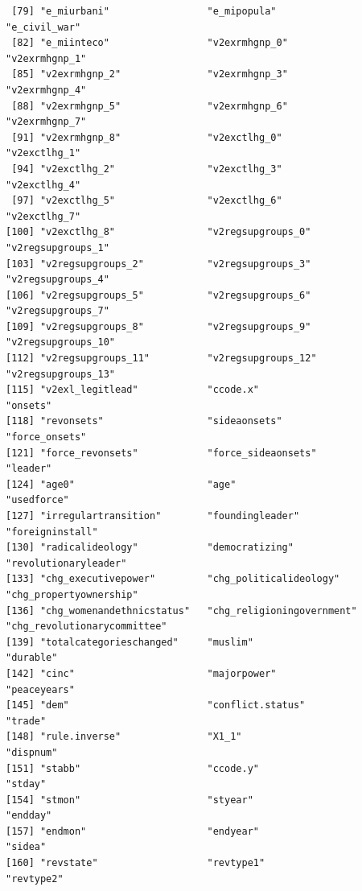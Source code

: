\documentclass[12pt]{article}
\begin{document}
\begin{verbatim}
 [79] "e_miurbani"                 "e_mipopula"                 "e_civil_war"               
 [82] "e_miinteco"                 "v2exrmhgnp_0"               "v2exrmhgnp_1"              
 [85] "v2exrmhgnp_2"               "v2exrmhgnp_3"               "v2exrmhgnp_4"              
 [88] "v2exrmhgnp_5"               "v2exrmhgnp_6"               "v2exrmhgnp_7"              
 [91] "v2exrmhgnp_8"               "v2exctlhg_0"                "v2exctlhg_1"               
 [94] "v2exctlhg_2"                "v2exctlhg_3"                "v2exctlhg_4"               
 [97] "v2exctlhg_5"                "v2exctlhg_6"                "v2exctlhg_7"               
[100] "v2exctlhg_8"                "v2regsupgroups_0"           "v2regsupgroups_1"          
[103] "v2regsupgroups_2"           "v2regsupgroups_3"           "v2regsupgroups_4"          
[106] "v2regsupgroups_5"           "v2regsupgroups_6"           "v2regsupgroups_7"          
[109] "v2regsupgroups_8"           "v2regsupgroups_9"           "v2regsupgroups_10"         
[112] "v2regsupgroups_11"          "v2regsupgroups_12"          "v2regsupgroups_13"         
[115] "v2exl_legitlead"            "ccode.x"                    "onsets"                    
[118] "revonsets"                  "sideaonsets"                "force_onsets"              
[121] "force_revonsets"            "force_sideaonsets"          "leader"                    
[124] "age0"                       "age"                        "usedforce"                 
[127] "irregulartransition"        "foundingleader"             "foreigninstall"            
[130] "radicalideology"            "democratizing"              "revolutionaryleader"       
[133] "chg_executivepower"         "chg_politicalideology"      "chg_propertyownership"     
[136] "chg_womenandethnicstatus"   "chg_religioningovernment"   "chg_revolutionarycommittee"
[139] "totalcategorieschanged"     "muslim"                     "durable"                   
[142] "cinc"                       "majorpower"                 "peaceyears"                
[145] "dem"                        "conflict.status"            "trade"                     
[148] "rule.inverse"               "X1_1"                       "dispnum"                   
[151] "stabb"                      "ccode.y"                    "stday"                     
[154] "stmon"                      "styear"                     "endday"                    
[157] "endmon"                     "endyear"                    "sidea"                     
[160] "revstate"                   "revtype1"                   "revtype2"                  

\end{verbatim}
\end{document}
